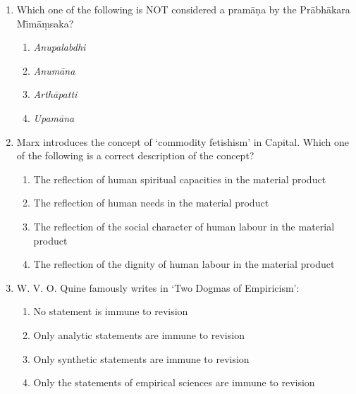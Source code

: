 \documentclass[12pt]{article}
\theoremstyle{remark}
\begin{document}
\begin{enumerate}
\begin{enumerate}
\end{enumerate}
\hfill{}
\item Which one of the following is NOT considered a pram\={a}\d{n}a by the Pr\={a}bh\={a}kara M\={\i}m\={a}\d{m}saka?
\begin{enumerate}
    \item \textit{Anupalabdhi} 
    \item \textit{Anum\={a}na} 
    \item \textit{Arth\={a}patti} 
    \item \textit{Upam\={a}na} 
\end{enumerate}
\hfill{}
\item Marx introduces the concept of ‘commodity fetishism’ in Capital. Which one of the following is a correct description of the concept?
\begin{enumerate}
    \item The reflection of human spiritual capacities in the material product
    \item The reflection of human needs in the material product
    \item The reflection of the social character of human labour in the material product
    \item The reflection of the dignity of human labour in the material product
\end{enumerate}
\hfill{}
\item W. V. O. Quine famously writes in ‘Two Dogmas of Empiricism’:
\begin{enumerate}
    \item No statement is immune to revision
    \item Only analytic statements are immune to revision
    \item Only synthetic statements are immune to revision
    \item Only the statements of empirical sciences are immune to revision
\end{enumerate}

\end{enumerate}
\end{document}
